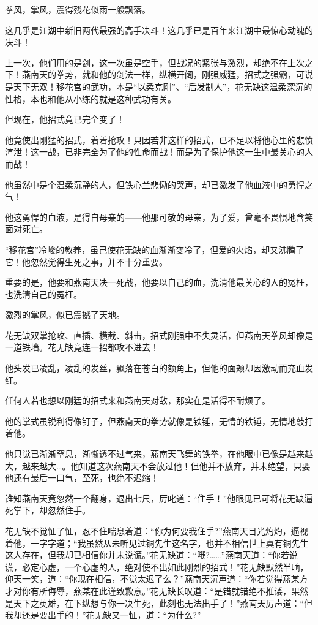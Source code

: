 \documentclass[12pt,oneside]{book}
\begin{document}
拳风，掌风，震得残花似雨一般飘落。

这几乎是江湖中新旧两代最强的高手决斗！这几乎已是百年来江湖中最惊心动魄的决斗！

上一次，他们用的是剑，这一次虽是空手，但战况的紧张与激烈，却绝不在上次之下！燕南天的拳势，就和他的剑法一样，纵横开阔，刚强威猛，招式之强霸，可说是天下无双！移花宫的武功，本是``以柔克刚''、``后发制人''，花无缺这温柔深沉的性格，本也和他从小练的就是这种武功有关。

但现在，他招式竟已完全变了！

他竟使出刚猛的招式，着着抢攻！只因若非这样的招式，已不足以将他心里的悲愤渲泄！这一战，已非完全为了他的性命而战！而是为了保护他这一生中最关心的人而战！

他虽然中是个温柔沉静的人，但铁心兰悲恸的哭声，却已激发了他血液中的勇悍之气！

他这勇悍的血液，是得自母亲的------他那可敬的母亲，为了爱，曾毫不畏惧地含笑面对死亡。

``移花宫''冷峻的教养，虽己使花无缺的血渐渐变冷了，但爱的火焰，却又沸腾了它！他忽然觉得生死之事，并不十分重要。

重要的是，他要和燕南天决一死战，他要以自己的血，洗清他最关心的人的冤枉，也洗清自己的冤枉。

激烈的掌风，似已震撼了天地。

花无缺双掌抢攻、直插、横截、斜击，招式刚强中不失灵活，但燕南天拳风却像是一道铁墙。花无缺竟连一招都攻不进去！

他头发已凌乱，凌乱的发丝，飘落在苍白的额角上，但他的面颊却因激动而充血发红。

任何人若也想以刚猛的招式来和燕南天对敌，那实在是活得不耐烦了。

他的掌式虽锐利得像钉子，但燕南天的拳势就像是铁锤，无情的铁锤，无情地敲打着他。

他只觉已渐渐窒息，渐惭透不过气来，燕南天飞舞的铁拳，在他眼中已像是越来越大，越来越大\ldots。他知道这次燕南天不会放过他！但他并不放弃，并未绝望，只要他还有最后一口气，至死，也绝不迟缩！

谁知燕南天竟忽然一个翻身，退出七尺，厉叱道：``住手！''他眼见已可将花无缺逼死掌下，却忽然住手。

花无缺不觉怔了怔，忍不住喘息着道：``你为何要我住手?''燕南天目光灼灼，逼视着他，一字字道；``我虽然从未听见过铜先生这名字，也并不相信世上真有铜先生这人存在，但我却已相信你并未说谎。''花无缺道：``哦?\ldots\ldots{}''燕南天道：``你若说谎，必定心虚，一个心虚的人，绝对使不出如此刚烈的招式！''花无缺默然半晌，仰天一笑，道：``你现在相信，不觉太迟了么？''燕南天沉声道：``你若觉得燕某方才对你有所侮辱，燕某在此谨致歉意。''花无缺长叹道：``是错就错绝不推诿，果然是天下之英雄，在下纵想与你一决生死，此刻也无法出手了！''燕南天厉声道：``但我却还是要出手的！''花无缺又一怔，道：``为什么?''
\end{document}
